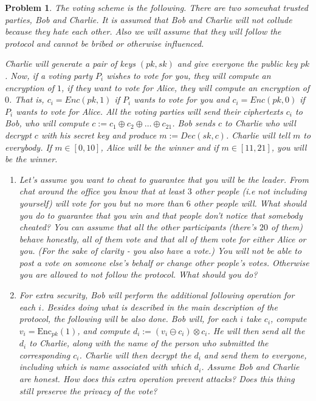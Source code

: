 \documentclass{../homework}
\newtheorem{problem}{Problem}
\newcommand{\Enc}{\text{Enc}}
\begin{document}
\begin{problem}
    The voting scheme is the following.
    There are two somewhat trusted parties, Bob and Charlie.
    It is assumed that Bob and Charlie will not collude because they hate each
    other.
    Also we will assume that they will follow the protocol and cannot be bribed
    or otherwise influenced.
    
    Charlie will generate a pair of keys $(pk,sk)$ and give everyone the public
    key $pk$. Now, if a voting  party $P_i$ wishes to vote for you, they will
    compute an encryption of $1$, if they want to vote for Alice, they will
    compute an encryption of $0$. That is, $c_i=Enc(pk,1)$ if $P_i$ wants to
    vote for you and  $c_i=Enc(pk,0)$ if $P_i$ wants to vote for Alice. All the
    voting parties will send their ciphertexts $c_i$ to Bob, who will compute
    $c:=c_1\oplus c_2 \oplus \dots \oplus c_{21}$. Bob sends $c$ to Charlie who
    will decrypt $c$ with his secret key and produce $m:=Dec(sk,c)$. Charlie
    will tell $m$ to everybody. If $m\in[0,10]$, Alice will be the winner and
    if $m\in [11,21]$, you will be the winner.
    
    \begin{enumerate}
        \item Let's assume you want to cheat to guarantee that you will be the
        leader. From chat around the office you know that at least $3$ other
        people (i.e not including yourself) will vote for you but no more than
        $6$ other people will. What should you do to guarantee that you win and
        that people don't notice that somebody cheated? You can assume that all
        the other participants (there's $20$ of them) behave honestly, all of
        them vote and that all of them vote for either Alice or you. (For the
        sake of clarity - you also have a vote.) You will not be able to post a
        vote on someone else's behalf or change other people's votes. Otherwise
        you are allowed to not follow the protocol. What should you do?
        
        \item For extra security, Bob will perform the additional following
        operation for each $i$. Besides doing what is described in the main
        description of the protocol, the following will be also done. Bob will,
        for each $i$ take $c_i$, compute $v_i=\Enc_{pk}(1)$, and compute
        $d_i:=(v_i\ominus c_i)\otimes c_i$. He will then send all the $d_i$ to
        Charlie, along with the name of the person who submitted the
        corresponding $c_i$. Charlie will then decrypt the $d_i$ and send them
        to everyone, including which is name associated with which $d_i$.
        Assume Bob and Charlie are honest. How does this extra operation
        prevent attacks? Does this thing still preserve the privacy of the
        vote?
    \end{enumerate}
\end{problem}
\end{document}
